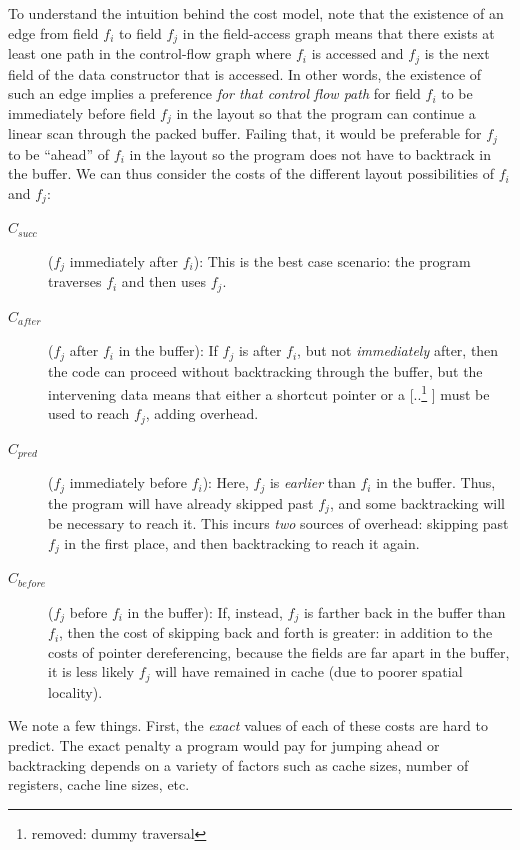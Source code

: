 \documentclass[acmsmall,review,anonymous]{acmart}\settopmatter{printfolios=true,printccs=false,printacmref=false}
\newcommand{\new}[1]{{\color{very-dark-green}{#1}}}
\newcommand{\new}[1]{#1}
\providecommand{\DIFaddtex}[1]{{\protect\color{blue} \sf #1}} %
\providecommand{\DIFdeltex}[1]{{\protect\color{red} [..\footnote{removed: #1} ]}} %
\providecommand{\DIFaddbegin}{} %
\providecommand{\DIFaddend}{} %
\providecommand{\DIFdelbegin}{} %
\providecommand{\DIFdelend}{} %
\providecommand{\DIFadd}[1]{\texorpdfstring{\DIFaddtex{#1}}{#1}} %
\providecommand{\DIFdel}[1]{\texorpdfstring{\DIFdeltex{#1}}{}} %
\newcommand{\DIFscaledelfig}{0.5}
\newlength{\DIFdelgraphicswidth} %
\newlength{\DIFdelgraphicsheight} %
\newcommand{\DIFaddincludegraphics}[2][]{{\color{blue}\fbox{\DIFOincludegraphics[#1]{#2}}}} %
\newcommand{\DIFdelincludegraphics}[2][]{%
\sbox{\DIFdelgraphicsbox}{\DIFOincludegraphics[#1]{#2}}%
\settoboxwidth{\DIFdelgraphicswidth}{\DIFdelgraphicsbox} %
\settoboxtotalheight{\DIFdelgraphicsheight}{\DIFdelgraphicsbox} %
\scalebox{\DIFscaledelfig}{%
\parbox[b]{\DIFdelgraphicswidth}{\usebox{\DIFdelgraphicsbox}\\[-\baselineskip] \rule{\DIFdelgraphicswidth}{0em}}\llap{\resizebox{\DIFdelgraphicswidth}{\DIFdelgraphicsheight}{%
\setlength{\unitlength}{\DIFdelgraphicswidth}%
\begin{picture}(1,1)%
\thicklines\linethickness{2pt} %
{\color[rgb]{1,0,0}\put(0,0){\framebox(1,1){}}}%
{\color[rgb]{1,0,0}\put(0,0){\line( 1,1){1}}}%
{\color[rgb]{1,0,0}\put(0,1){\line(1,-1){1}}}%
\end{picture}%
}\hspace*{3pt}}} %
} %
\DeclareRobustCommand{\DIFaddbegin}{\DIFOaddbegin \let\includegraphics\DIFaddincludegraphics} %
\DeclareRobustCommand{\DIFaddend}{\DIFOaddend \let\includegraphics\DIFOincludegraphics} %
\DeclareRobustCommand{\DIFdelbegin}{\DIFOdelbegin \let\includegraphics\DIFdelincludegraphics} %
\DeclareRobustCommand{\DIFdelend}{\DIFOaddend \let\includegraphics\DIFOincludegraphics} %
\begin{document}
To understand the intuition behind the cost model, note that the existence of an edge from field $f_i$ to field $f_j$ in the field-access graph means that there exists at least one path in the control-flow graph where $f_i$ is accessed and $f_j$ is the next field of the data constructor that is accessed.
In other words, the existence of such an edge implies a preference {\em for that control flow path} for field $f_i$ to be immediately before field $f_j$ in the layout so that the program can continue a linear scan through the packed buffer. 
Failing that, it would be preferable for $f_j$ to be ``ahead'' of $f_i$ in the layout so the program does not have to backtrack in the buffer.
We can thus consider the costs of the different layout possibilities of $f_i$ and $f_j$:

\begin{description}
	\item[$C_{\mathit{succ}}$] ($f_j$ immediately after $f_i$): This is the best case scenario: the program traverses $f_i$ and then uses $f_j$.
	\item[$C_{\mathit{after}}$] ($f_j$ after $f_i$ in the buffer): If $f_j$ is after $f_i$, but not {\em immediately} after, then the code can proceed without backtracking through the buffer, but the intervening data means that either a shortcut pointer or a \DIFdelbegin \DIFdel{dummy traversal }\DIFdelend \DIFaddbegin \DIFadd{\new{extra traversal} }\DIFaddend must be used to reach $f_j$, adding overhead.
	\item[$C_{\mathit{pred}}$] ($f_j$ immediately before $f_i$): Here, $f_j$ is {\em earlier} than $f_i$ in the buffer. Thus, the program will have already skipped past $f_j$, and some backtracking will be necessary to reach it. This incurs {\em two} sources of overhead: skipping past $f_j$ in the first place, and then backtracking to reach it again.
	\item[$C_{\mathit{before}}$] ($f_j$ before $f_i$ in the buffer): If, instead, $f_j$ is farther back in the buffer than $f_i$, then the cost of skipping back and forth is greater: in addition to the costs of pointer dereferencing, because the fields are far apart in the buffer, it is less likely $f_j$ will have remained in cache (due to poorer spatial locality).
\end{description}

We note a few things. 
First, the {\em exact} values of each of these costs are hard to predict. 
The exact penalty a program would pay for jumping ahead or backtracking depends on a variety of factors such as cache sizes, number of registers, cache line sizes, etc.
\end{document}
